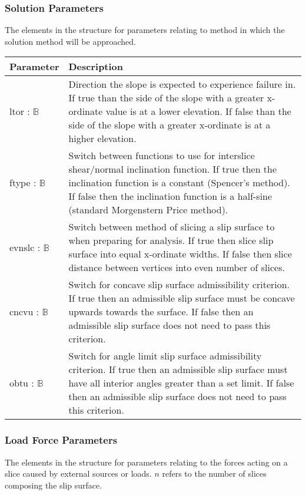 \documentclass[12pt, titlepage]{article}
\begin{document}
\subsubsection{Solution Parameters} \label{Tbl:SolnParam}
\noindent
The elements in the structure for parameters relating to method in
which the solution method will be approached.

\begin{center}
\begin{longtable}{ p{} 
    p{}}\hline 

  \textbf{Parameter} & \textbf{Description}\\ \hline

  ltor : $\mathbb{B}$ & Direction the slope is expected to
  experience failure in. If true than the side of the slope with a
  greater x-ordinate value is at a lower elevation. If false than the
  side of the slope with a greater x-ordinate is at a higher
  elevation.\\

  ftype : $\mathbb{B}$ & Switch between functions to use for
  interslice shear/normal inclination function. If true then the
  inclination function is a constant (Spencer's method). If false then
  the inclination function is a half-sine (standard Morgenstern Price
  method). \\

  evnslc : $\mathbb{B}$ & Switch between method of slicing a slip
  surface to when preparing for analysis. If true then slice slip
  surface into equal x-ordinate widths. If false then slice distance
  between vertices into even number of slices. \\

  cncvu : $\mathbb{B}$ & Switch for concave slip surface admissibility
  criterion. If true then an admissible slip surface must be concave
  upwards towards the surface. If false then an admissible slip
  surface does not need to pass this criterion.\\

  obtu : $\mathbb{B}$ & Switch for angle limit slip surface
  admissibility criterion. If true then an admissible slip surface
  must have all interior angles greater than a set limit. If false
  then an admissible slip surface does not need to pass this
  criterion.\\ \hline
\end{longtable}
\end{center}

\subsubsection{Load Force Parameters} \label{Tbl:LoadForceParam}
\noindent
The elements in the structure for parameters relating to the forces
acting on a slice caused by external sources or loads. $n$ refers to
the number of slices composing the slip surface.
\end{document}
